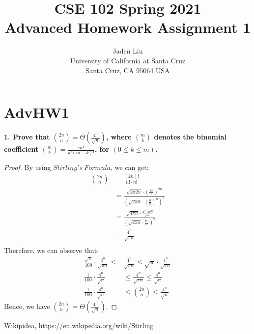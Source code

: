 \documentclass[12pt]{article}
\begin{document}
\title{ CSE 102 Spring 2021\\
	Advanced Homework Assignment 1}

\author{Jaden Liu \\ 
University of California at Santa Cruz\\
Santa Cruz, CA 95064 USA }

\maketitle


\section{AdvHW1} 

\textbf{1. Prove that $\binom{2n}{n}=\Theta(\frac{4^n}{\sqrt{n}})$, where $\binom{m}{k}$ denotes the binomial coefficient $\binom{m}{k}=\frac{m!}{k!(m-k)!}$, for $(0\le k\le m)$.}\\
\begin{proof}
	By using $Stirling's\ Formula$, we can get:\cite{wiki}
	\begin{align*}
		\binom{2n}{n}&=\frac{(2n)!}{n!\cdot n!}\\
		&=\frac{\sqrt{2\pi 2n}\cdot(\frac{2n}{e})^{2n}}{(\sqrt{2\pi n}\cdot(\frac{n}{e})^n)^2}\\
		&=\frac{\sqrt{4\pi n}\cdot\frac{4^n\cdot n^{2n}}{e^{2n}}}{(\sqrt{2\pi n}\cdot\frac{n^n}{e^n})^2}\\
		&=\frac{4^n}{\sqrt{\pi n}}\\
	\end{align*}
Therefore, we can observe that:
\begin{align*}
	\frac{\sqrt{\pi}}{100}\cdot\frac{4^n}{\sqrt{\pi n}}\le&\frac{4^n}{\sqrt{\pi n}}\le\sqrt{\pi}\cdot\frac{4^n}{\sqrt{\pi n}}\\
	\frac{1}{100}\cdot\frac{4^n}{\sqrt{n}}&\le\frac{4^n}{\sqrt{\pi n}}\le\frac{4^n}{\sqrt{n}}\\
	\frac{1}{100}\cdot\frac{4^n}{\sqrt{n}}&\le\binom{2n}{n}\le\frac{4^n}{\sqrt{n}}
\end{align*}
Hence, we have $\binom{2n}{n}=\Theta(\frac{4^n}{\sqrt{n}})$.
\end{proof}



\bigskip


\begin{thebibliography}{wiki}
	 Wikipidea, https://en.wikipedia.org/wiki/Stirling%
\end{thebibliography}
\end{document}
